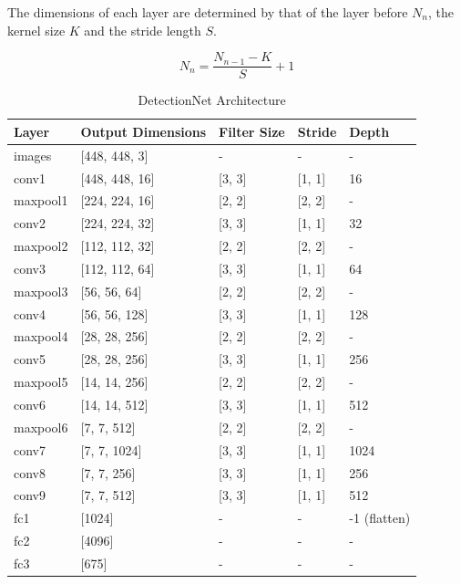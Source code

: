\documentclass{article}
\begin{document}
The dimensions of each layer are determined by that of the layer before $N_n$, the kernel size $K$ and the stride length $S$.

\begin{equation}
N_n = \frac{N_{n-1} - K}{S} + 1
\end{equation}



\begin{table}[h!]
\centering
\begin{tabular}{|l|l|l|l|l|}
\hline
Layer    & Output Dimensions  & Filter Size & Stride     & Depth        \\ \hline
images   & {[}448, 448, 3{]}  & -           & -          & -            \\ \hline
conv1    & {[}448, 448, 16{]} & {[}3, 3{]}  & {[}1, 1{]} & 16           \\ \hline
maxpool1 & {[}224, 224, 16{]} & {[}2, 2{]}  & {[}2, 2{]} & -            \\ \hline
conv2    & {[}224, 224, 32{]} & {[}3, 3{]}  & {[}1, 1{]} & 32           \\ \hline
maxpool2 & {[}112, 112, 32{]} & {[}2, 2{]}  & {[}2, 2{]} & -            \\ \hline
conv3    & {[}112, 112, 64{]} & {[}3, 3{]}  & {[}1, 1{]} & 64           \\ \hline
maxpool3 & {[}56, 56, 64{]}   & {[}2, 2{]}  & {[}2, 2{]} & -            \\ \hline
conv4    & {[}56, 56, 128{]}  & {[}3, 3{]}  & {[}1, 1{]} & 128          \\ \hline
maxpool4 & {[}28, 28, 256{]}  & {[}2, 2{]}  & {[}2, 2{]} & -            \\ \hline
conv5    & {[}28, 28, 256{]}  & {[}3, 3{]}  & {[}1, 1{]} & 256          \\ \hline
maxpool5 & {[}14, 14, 256{]}  & {[}2, 2{]}  & {[}2, 2{]} & -            \\ \hline
conv6    & {[}14, 14, 512{]}  & {[}3, 3{]}  & {[}1, 1{]} & 512          \\ \hline
maxpool6 & {[}7, 7, 512{]}    & {[}2, 2{]}  & {[}2, 2{]} & -            \\ \hline
conv7    & {[}7, 7, 1024{]}   & {[}3, 3{]}  & {[}1, 1{]} & 1024         \\ \hline
conv8    & {[}7, 7, 256{]}    & {[}3, 3{]}  & {[}1, 1{]} & 256          \\ \hline
conv9    & {[}7, 7, 512{]}    & {[}3, 3{]}  & {[}1, 1{]} & 512          \\ \hline
fc1      & {[}1024{]}         & -           & -          & -1 (flatten) \\ \hline
fc2      & {[}4096{]}         & -           & -          & -            \\ \hline
fc3      & {[}675{]}          & -           & -          & -            \\ \hline
\end{tabular}
\caption{DetectionNet Architecture}
\end{table}
\end{document}
